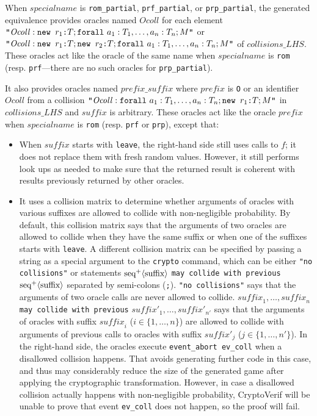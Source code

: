\begin{itemize}
\begin{itemize}
\end{itemize}
When $\mathit{specialname}$ is \texttt{rom\_partial}, \texttt{prf\_partial}, or \texttt{prp\_partial},
the generated equivalence provides oracles named $\mathit{Ocoll}$ for each
element $\texttt{"}\mathit{Ocoll}: \texttt{new\ }{r_1}\texttt{:}{T}; \texttt{forall}\ a_1:T_1, \dots, a_n:T_n; M\texttt{"}$
or $\texttt{"}\mathit{Ocoll}: \texttt{new\ }{r_1}\texttt{:}{T}; \texttt{new\ }{r_2}\texttt{:}{T}; \texttt{forall}\ a_1:T_1, \dots, a_n:T_n; M\texttt{"}$
of $\mathit{collisions\_LHS}$.
These oracles act like the oracle of the same name when $\mathit{specialname}$ is \texttt{rom} (resp. \texttt{prf}---there are no such oracles for \texttt{prp\_partial}).

It also provides oracles named $\mathit{prefix}\texttt{\_}\mathit{suffix}$
where $\mathit{prefix}$ is \texttt{O} or an identifier $\mathit{Ocoll}$ from a collision $\texttt{"}\mathit{Ocoll}: \texttt{forall}\ a_1:T_1, \dots, a_n:T_n; \texttt{new\ }{r_1}\texttt{:}{T}; M\texttt{"}$ in $\mathit{collisions\_LHS}$
and $\mathit{suffix}$ is arbitrary. These oracles act like the oracle $\mathit{prefix}$ when $\mathit{specialname}$ is \texttt{rom} (resp. \texttt{prf} or \texttt{prp}), except that:
\begin{itemize}
\item When $\mathit{suffix}$ starts with \texttt{leave}, 
  the right-hand side still uses calls to $f$; it does not replace them
  with fresh random values. However, it still performs look ups as needed
  to make sure that the returned result is coherent with results
  previously returned by other oracles.
\item It uses a collision matrix to determine whether arguments
  of oracles with various suffixes are allowed to collide with non-negligible
  probability. By default, this collision matrix says that 
  the arguments of two oracles are allowed to collide when they have the same suffix
  or when one of the suffixes starts with \texttt{leave}.
  A different collision matrix can be specified by passing
  a string as a special argument to the \texttt{crypto} command, which can be
either \texttt{"no collisions"} or statements $\textrm{seq}^+\langle\textrm{suffix}\rangle$ {\tt may collide with previous} $\textrm{seq}^+\langle\textrm{suffix}\rangle$
separated by semi-colons (\texttt{;}). \texttt{"no collisions"} says that the arguments of two oracle calls are never allowed to collide.
$\mathit{suffix}_1, \dots, \mathit{suffix}_n$ {\tt may collide with previous} $\mathit{suffix}'_1, \dots, \mathit{suffix}'_{n'}$ says that the arguments of oracles with suffix $\mathit{suffix}_i$ ($i \in \{1, \dots, n\}$) are allowed to collide with arguments of previous calls to oracles with suffix $\mathit{suffix}'_j$ ($j \in \{1, \dots, n'\}$).
In the right-hand side, the oracles execute \texttt{event\_abort ev\_coll} when a disallowed collision happens. That avoids generating further code in this case, and thus may considerably reduce the size of the generated game after applying the cryptographic transformation. However, in case a disallowed collision actually happens with non-negligible probability, CryptoVerif will be unable to prove that event \texttt{ev\_coll} does not happen, so the proof will fail.


\end{itemize}
\end{itemize}
